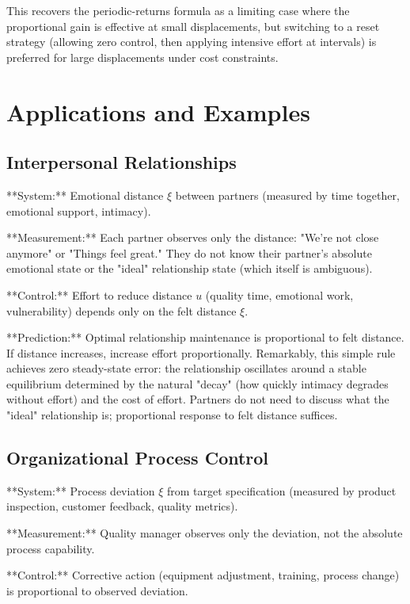 \documentclass[12pt]{article}
\begin{document}
This recovers the periodic-returns formula as a limiting case where the proportional gain is effective at small displacements, but switching to a reset strategy (allowing zero control, then applying intensive effort at intervals) is preferred for large displacements under cost constraints.

\section{Applications and Examples}

\subsection{Interpersonal Relationships}

**System:** Emotional distance $\xi$ between partners (measured by time together, emotional support, intimacy).

**Measurement:** Each partner observes only the distance: "We're not close anymore" or "Things feel great." They do not know their partner's absolute emotional state or the "ideal" relationship state (which itself is ambiguous).

**Control:** Effort to reduce distance $u$ (quality time, emotional work, vulnerability) depends only on the felt distance $\xi$.

**Prediction:** Optimal relationship maintenance is proportional to felt distance. If distance increases, increase effort proportionally. Remarkably, this simple rule achieves zero steady-state error: the relationship oscillates around a stable equilibrium determined by the natural "decay" (how quickly intimacy degrades without effort) and the cost of effort. Partners do not need to discuss what the "ideal" relationship is; proportional response to felt distance suffices.

\subsection{Organizational Process Control}

**System:** Process deviation $\xi$ from target specification (measured by product inspection, customer feedback, quality metrics).

**Measurement:** Quality manager observes only the deviation, not the absolute process capability.

**Control:** Corrective action (equipment adjustment, training, process change) is proportional to observed deviation.
\end{document}
